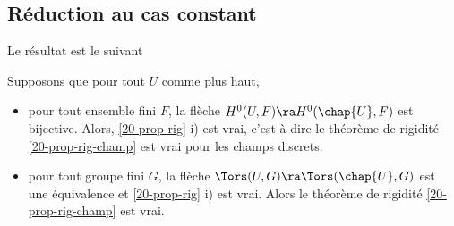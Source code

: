 \documentclass[10pt]{../fichiers-configuration-latex/smfart}
\begin{document}
\subsection{Réduction au cas constant}

Le résultat est le suivant

\begin{proposition2}\label{20-reduc-const}Supposons que pour tout $U$ comme plus haut,
\begin{itemize} \item[i)] pour tout ensemble fini $F$, la flèche $H^0(U,F)\ra H^0( \chap{U},F)$ est
bijective. Alors, \ref{20-prop-rig} i) est vrai, c'est-à-dire le théorème de rigidité
\ref{20-prop-rig-champ} est vrai pour les champs discrets.  \item[ii)]  pour tout groupe fini $G$,
la flèche $\Tors(U,G)\ra\Tors(\chap{U},G)$ est une équivalence et \ref{20-prop-rig} i) est vrai.
Alors le théorème de rigidité \ref{20-prop-rig-champ} est vrai.  \end{itemize} \end{proposition2}
\end{document}
